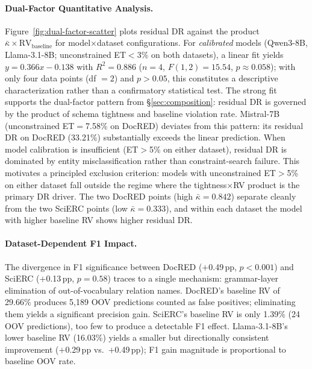 
\paragraph{Dual-Factor Quantitative Analysis.}
\label{app:dual-factor}

Figure~\ref{fig:dual-factor-scatter} plots residual DR against the product $\bar{\kappa} \times \text{RV}_{\text{baseline}}$ for model$\times$dataset configurations.
For \emph{calibrated} models (Qwen3-8B, Llama-3.1-8B; unconstrained ET${<}$3\% on both datasets), a linear fit yields $y = 0.366x - 0.138$ with $R^2 = 0.886$ ($n{=}4$, $F(1,2) = 15.54$, $p \approx 0.058$); with only four data points (df $= 2$) and $p > 0.05$, this constitutes a descriptive characterization rather than a confirmatory statistical test.
The strong fit supports the dual-factor pattern from \S\ref{sec:composition}: residual DR is governed by the product of schema tightness and baseline violation rate.
Mistral-7B (unconstrained ET${=}$7.58\% on DocRED) deviates from this pattern: its residual DR on DocRED (33.21\%) substantially exceeds the linear prediction. When model calibration is insufficient (ET${>}$5\% on either dataset), residual DR is dominated by entity misclassification rather than constraint-search failure.
This motivates a principled exclusion criterion: models with unconstrained ET${>}$5\% on either dataset fall outside the regime where the tightness$\times$RV product is the primary DR driver.
The two DocRED points (high $\bar{\kappa}{=}0.842$) separate cleanly from the two SciERC points (low $\bar{\kappa}{=}0.333$), and within each dataset the model with higher baseline RV shows higher residual DR.



\paragraph{Dataset-Dependent F1 Impact.}
The divergence in F1 significance between DocRED ($+$0.49\,pp, $p < 0.001$) and SciERC ($+$0.13\,pp, $p = 0.58$) traces to a single mechanism: grammar-layer elimination of out-of-vocabulary relation names.
DocRED's baseline RV of 29.66\% produces 5{,}189 OOV predictions counted as false positives; eliminating them yields a significant precision gain.
SciERC's baseline RV is only 1.39\% (24 OOV predictions), too few to produce a detectable F1 effect.
Llama-3.1-8B's lower baseline RV (16.03\%) yields a smaller but directionally consistent improvement ($+$0.29\,pp vs.\ $+$0.49\,pp); F1 gain magnitude is proportional to baseline OOV rate.


